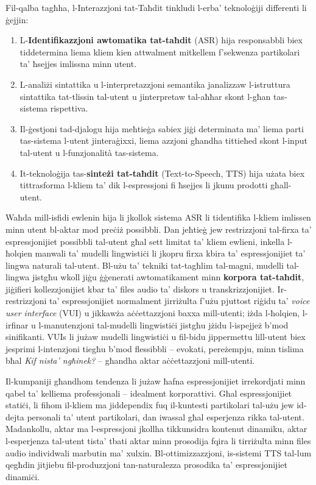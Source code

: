 \documentclass[]{../../metanetpaper}
\begin{document}
\begin{multicols}{2}
Fil-qalba tagħha, l-Interazzjoni tat-Taħdit tinkludi l-erba’ teknoloġiji differenti li ġejjin:

\begin{enumerate}
\item L-\textbf{Identifikazzjoni awtomatika tat-taħdit} (ASR) hija responsabbli biex tiddetermina liema kliem kien attwalment mitkellem f’sekwenza partikolari ta’ ħsejjes imlissna minn utent.
\item L-analiżi sintattika u l-interpretazzjoni semantika janalizzaw l-istruttura sintattika tat-tlissin tal-utent u jinterpretaw tal-aħħar skont l-għan tas-sistema rispettiva.
\item Il-ġestjoni tad-djalogu hija meħtieġa sabiex jiġi determinata ma’ liema parti tas-sistema l-utent jinteraġixxi, liema azzjoni għandha tittieħed skont l-input tal-utent u l-funzjonalità tas-sistema.
\item It-teknoloġija tas-\textbf{sinteżi tat-taħdit} (Text-to-Speech, TTS) hija użata biex tittrasforma l-kliem ta’ dik l-espressjoni fi ħsejjes li jkunu prodotti għall-utent. 
\end{enumerate}

Waħda mill-isfidi ewlenin hija li jkollok sistema ASR li tidentifika  l-kliem imlissen minn utent bl-aktar mod preċiż possibbli. Dan jeħtieġ jew restrizzjoni tal-firxa ta’ espressjonijiet possibbli tal-utent għal sett limitat ta’ kliem ewlieni, inkella l-ħolqien manwali ta’ mudelli lingwistiċi li jkopru firxa kbira ta’ espressjonijiet ta’ lingwa naturali tal-utent. Bl-użu ta' tekniki tat-tagħlim tal-magni, mudelli tal-lingwa jistgħu wkoll jiġu ġġenerati awtomatikament minn  \textbf{korpora tat-taħdit}, jiġifieri kollezzjonijiet kbar ta' files audio ta' diskors u transkrizzjonijiet. Ir-restrizzjoni ta' espressjonijiet normalment jirriżulta f’użu pjuttost riġidu ta’ \emph{voice user interface} (VUI) u jikkawża aċċettazzjoni baxxa mill-utenti; iżda l-ħolqien, l-irfinar u l-manutenzjoni tal-mudelli lingwistiċi jistgħu jżidu l-ispejjeż b’mod sinifikanti. VUIs li jużaw mudelli lingwistiċi u fil-bidu jippermettu lill-utent biex jesprimi l-intenzjoni tiegħu b’mod flessibbli -- evokati, pereżempju, minn tislima bħal \emph{Kif nista’ ngħinek?} -- għandha aktar aċċettazzjoni mill-utenti. 

Il-kumpaniji għandhom tendenza li jużaw ħafna espressjonijiet irrekordjati minn qabel ta’ kelliema professjonali – idealment korporattivi. Għal espressjonijiet statiċi, li fihom il-kliem ma jiddependix fuq il-kuntesti partikolari tal-użu jew id-dejta personali ta’ utent partikolari, dan iwassal għal esperjenza rikka tal-utent. Madankollu, aktar ma l-espressjoni jkollha tikkunsidra kontenut dinamiku, aktar l-esperjenza tal-utent tista’ tbati aktar minn prosodija fqira li tirriżulta minn files audio individwali marbutin ma’ xulxin. Bl-ottimizzazzjoni, is-sistemi TTS tal-lum qegħdin jitjiebu fil-produzzjoni tan-naturalezza prosodika ta’ espressjonijiet dinamiċi.


\end{multicols}
\end{document}
